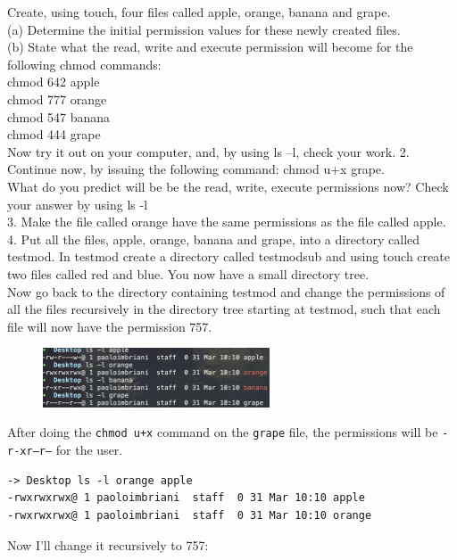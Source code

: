 \documentclass[a4paper]{article}
\begin{document}
\textcolor{green!50!black}
{
Create, using touch, four files called apple, orange, banana and grape.\\
(a) Determine the initial permission values for these newly created files.\\
(b) State what the read, write and execute permission will become for the following
chmod commands:\\
chmod 642 apple\\
chmod 777 orange\\
chmod 547 banana\\
chmod 444 grape\\
Now try it out on your computer, and, by using ls –l, check your work.
2. Continue now, by issuing the following command: chmod u+x grape.\\
What do you predict will be be the read, write, execute permissions now? Check your
answer by using ls -l\\
3. Make the file called orange have the same permissions as the file called apple.\\
4. Put all the files, apple, orange, banana and grape, into a directory called testmod.
In testmod create a directory called testmodsub and using touch create two files called
red and blue. You now have a small directory tree.\\
Now go back to the directory containing testmod and change the permissions of all the
files recursively in the directory tree starting at testmod, such that each file will now
have the permission 757.
}

\begin{figure}[H]
    \centering
    \includegraphics[width=0.6\textwidth]{pract6ex1.png}
\end{figure}
\noindent
After doing the \texttt{chmod u+x} command on the \texttt{grape} file, the permissions will be \texttt{-r-xr--r--} for the user.\\

\begin{verbatim}
-> Desktop ls -l orange apple
-rwxrwxrwx@ 1 paoloimbriani  staff  0 31 Mar 10:10 apple
-rwxrwxrwx@ 1 paoloimbriani  staff  0 31 Mar 10:10 orange
\end{verbatim}
\noindent
Now I'll change it recursively to 757:
\end{document}
